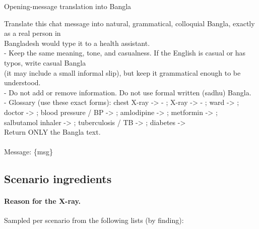 \begin{promptbox}{Opening-message translation into Bangla}
\par{\ttfamily\scriptsize\raggedright Translate this chat message into natural, grammatical, colloquial Bangla, exactly as a real person in \\\relax
Bangladesh would type it to a health assistant. \\\relax
- Keep the same meaning, tone, and casualness. If the English is casual or has typos, write casual Bangla \\\relax
\hspace*{1.0em}(it may include a small informal slip), but keep it grammatical enough to be understood. \\\relax
- Do not add or remove information. Do not use formal written (sadhu) Bangla. \\\relax
- Glossary (use these exact forms): chest X-ray -\textgreater{} - ; X-ray -\textgreater{} - ; ward -\textgreater{}  ; \\\relax
\hspace*{1.0em}doctor -\textgreater{}  ; blood pressure / BP -\textgreater{}  ; amlodipine -\textgreater{}  ; metformin -\textgreater{}  ; \\\relax
\hspace*{1.0em}salbutamol inhaler -\textgreater{}  ; tuberculosis / TB -\textgreater{}  ; diabetes -\textgreater{}  \\\relax
Return ONLY the Bangla text. \\\relax
\mbox{} \\\relax
Message: \{msg\}\par}
\end{promptbox}

\subsection{Scenario ingredients}\label{app:p:ingr}

\paragraph{Reason for the X-ray.} Sampled per scenario from the following lists (by finding):

